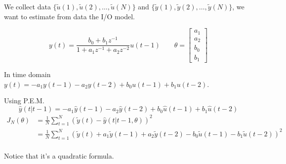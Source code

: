 \begin{exa}
    We collect data $\{ \tilde{u}(1), \tilde{u}(2), \dots, \tilde{u}(N) \}$ and $\{ \tilde{y}(1), \tilde{y}(2), \dots, \tilde{y}(N) \}$, we want to estimate from data the I/O model.

    \[
        y(t) = \frac{b_0 + b_1z^{-1}}{1+a_1z^{-1} + a_2z^{-2}}u(t-1) \qquad \theta = \begin{bmatrix}
            a_1 \\ a_2 \\ b_0 \\ b_1
        \end{bmatrix}
    \]

    In time domain $y(t) = -a_1y(t-1)-a_2y(t-2)+b_0u(t-1)+b_1u(t-2)$.

    Using P.E.M.
    \[
        \hat{y}(t|t-1) = -a_1\hat{y}(t-1)-a_2\hat{y}(t-2)+b_0\hat{u}(t-1)+b_1\hat{u}(t-2)
    \]
    \begin{align*}
        J_N(\theta) &= \frac{1}{N}\sum_{t=1}^N \left( \tilde{y}(t) - \hat{y}(t|t-1, \theta) \right)^2 \\
        &= \frac{1}{N}\sum_{t=1}^N \left( \tilde{y}(t) +a_1\tilde{y}(t-1)+a_2\tilde{y}(t-2)-b_0\tilde{u}(t-1)-b_1\tilde{u}(t-2) \right)^2 \\
    \end{align*}

    Notice that it's a quadratic formula.

    \begin{figure}[H]
        \begin{minipage}[t]{0.5\textwidth}
            \centering
\end{minipage}
\end{figure}
\end{exa}
